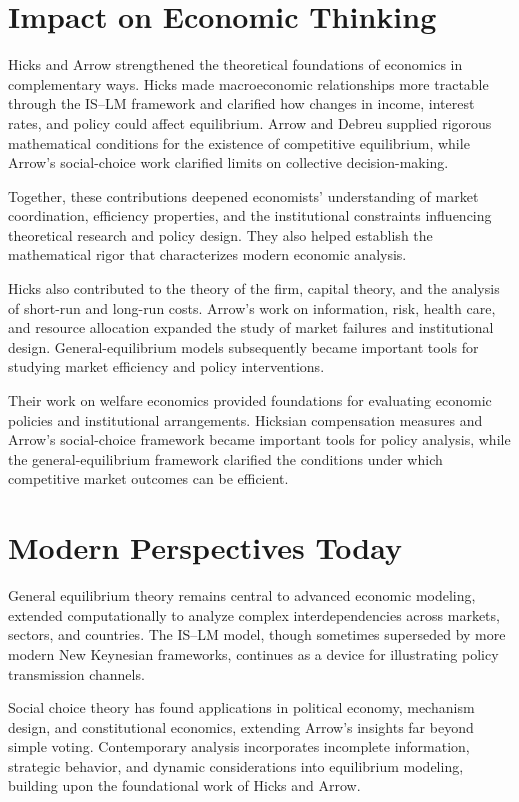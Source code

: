 \section{Impact on Economic Thinking}
Hicks and Arrow strengthened the theoretical foundations of economics in complementary ways. Hicks
made macroeconomic relationships more tractable through the IS--LM framework and clarified how
changes in income, interest rates, and policy could affect equilibrium. Arrow and Debreu supplied
rigorous mathematical conditions for the existence of competitive equilibrium, while Arrow's
social-choice work clarified limits on collective decision-making.

Together, these contributions deepened economists' understanding of market coordination, efficiency
properties, and the institutional constraints influencing theoretical research and policy design.
They also helped establish the mathematical rigor that characterizes modern economic analysis.

Hicks also contributed to the theory of the firm, capital theory, and the analysis of short-run and
long-run costs. Arrow's work on information, risk, health care, and resource allocation expanded
the study of market failures and institutional design. General-equilibrium models subsequently
became important tools for studying market efficiency and policy interventions.

Their work on welfare economics provided foundations for evaluating economic policies and
institutional arrangements. Hicksian compensation measures and Arrow's social-choice framework
became important tools for policy analysis, while the general-equilibrium framework clarified the
conditions under which competitive market outcomes can be efficient.

\section{Modern Perspectives Today}
General equilibrium theory remains central to advanced economic modeling, extended computationally
to analyze complex interdependencies across markets, sectors, and countries. The IS--LM model,
though sometimes superseded by more modern New Keynesian frameworks, continues as a device for
illustrating policy transmission channels.

Social choice theory has found applications in political economy, mechanism design, and
constitutional economics, extending Arrow's insights far beyond simple voting. Contemporary
analysis incorporates incomplete information, strategic behavior, and dynamic considerations
into equilibrium modeling, building upon the foundational work of Hicks and Arrow.

